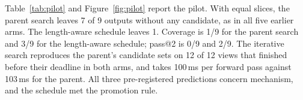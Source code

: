 Table~\ref{tab:pilot} and Figure~\ref{fig:pilot} report the pilot. With equal slices, the parent search leaves 7 of 9 outputs without any candidate, as in all five earlier arms. The length-aware schedule leaves 1. Coverage is 1/9 for the parent search and 3/9 for the length-aware schedule; pass@2 is 0/9 and 2/9. The iterative search reproduces the parent's candidate sets on 12 of 12 views that finished before their deadline in both arms, and takes 100\,ms per forward pass against 103\,ms for the parent. All three pre-registered predictions concern mechanism, and the schedule met the promotion rule.
